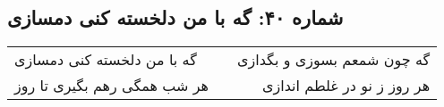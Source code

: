\begin{center}
\section*{شماره ۴۰: گه با من دلخسته کنی دمسازی}
\label{sec:040}
\begin{longtable}{l p{0.5cm} r}
گه با من دلخسته کنی دمسازی
&&
گه چون شمعم بسوزی و بگدازی
\\
هر شب همگی رهم بگیری تا روز
&&
هر روز ز نو در غلطم اندازی
\\
\end{longtable}
\end{center}
